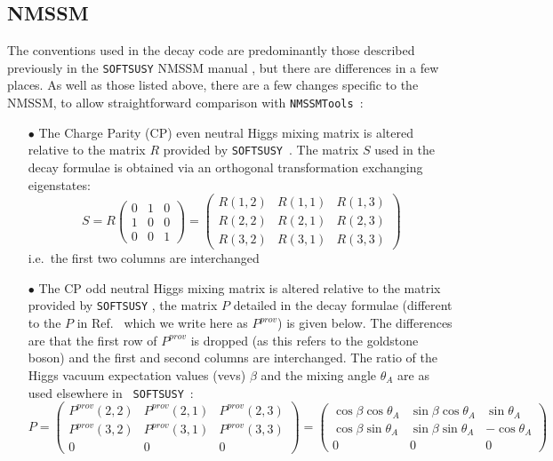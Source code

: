 \documentclass[final,3p,times,pdflatex]{elsarticle}
\begin{document}
\subsection{NMSSM} \label{NMSSMconventions}
The conventions used in the decay code are predominantly those described previously in the {\tt SOFTSUSY} NMSSM manual \cite{Allanach:2013kza}, but there are differences in a few places. As well as those listed above, there are a few changes specific to the NMSSM, to allow straightforward comparison with {\tt NMSSMTools}~\cite{Ellwanger:2004xm,Ellwanger:2006rn,Ellwanger:2012dd,Ellwanger:2006ch}:
\begin{itemize}
	\item[$\bullet$] The Charge Parity (CP) even neutral Higgs mixing matrix is altered relative to the matrix $R$ provided by {\tt SOFTSUSY}~\cite {Allanach:2013kza}. The matrix $S$ used in the decay formulae is obtained via an orthogonal transformation exchanging eigenstates:  
\begin{equation}
S = R \left( \begin{array}{ccc}
	0 & 1 & 0 \\
	1 & 0 & 0 \\
	0 & 0 & 1 \end{array} \right)
  =	\left( \begin{array}{ccc}
	R(1,2) & R(1,1) & R(1,3) \\
	R(2,2) & R(2,1) & R(2,3) \\
	R(3,2) & R(3,1) & R(3,3) \end{array} \right)
\end{equation}
i.e.\ the first two columns are interchanged 
	\item[$\bullet$] The CP odd neutral Higgs mixing matrix is altered
          relative to the matrix provided by {\tt SOFTSUSY}
          \cite{Allanach:2013kza}, the matrix $P$ detailed in the decay
          formulae (different to the $P$ in Ref.~\cite{Allanach:2013kza} which
          we write here as $P^{prov}$) is given below. The differences are
          that the           first 
          row of $P^{prov}$ is 
          dropped (as this refers to the goldstone boson) and the first and
          second columns are interchanged. The ratio of the Higgs vacuum
          expectation values (vevs) $\beta$ and the mixing angle $\theta_A$
          are as used elsewhere in {\tt
            SOFTSUSY}~\cite{Allanach:2001kg,Allanach:2013kza}: 
\begin{equation}
P = \left( \begin{array}{ccc}
	P^{prov}(2,2) & P^{prov}(2,1) & P^{prov}(2,3) \\
	P^{prov}(3,2) & P^{prov}(3,1) & P^{prov}(3,3) \\
	0 & 0 & 0 \end{array} \right)
	= \left( \begin{array}{ccc}
	\cos\beta\cos\theta_A & \sin\beta\cos\theta_A & \sin\theta_A \\
	\cos\beta\sin\theta_A & \sin\beta\sin\theta_A & -\cos\theta_A \\
	0 & 0 & 0 \end{array} \right)
\end{equation}

\end{itemize}
\end{document}
